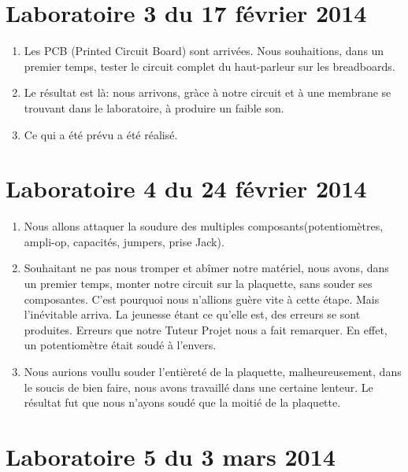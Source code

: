 \documentclass{report}
\begin{document}
\section{Laboratoire 3 du 17 février 2014}

\begin{enumerate}

\item  Les PCB (Printed Circuit Board) sont arrivées. Nous souhaitions, dans un premier temps, tester le circuit complet du haut-parleur sur les breadboards.

\item Le résultat est là: nous arrivons, gràce à notre circuit et à une membrane se trouvant dans le
laboratoire, à produire un faible son.

\item Ce qui a été prévu a été réalisé.

\end{enumerate}

\section{Laboratoire 4 du 24 février 2014}
\begin{enumerate}
\item
 Nous allons attaquer la soudure des multiples composants(potentiomètres, ampli-op, capacités, jumpers, prise Jack). 

\item
Souhaitant ne pas nous tromper et abîmer notre matériel, nous avons, dans un premier temps, monter notre circuit sur la plaquette, sans souder ses composantes. C'est pourquoi nous n'allions guère vite à cette étape. Mais l'inévitable arriva. La jeunesse étant ce qu'elle est, des erreurs se sont produites. Erreurs 
que notre Tuteur Projet nous a fait remarquer. En effet, un potentiomètre était soudé à l'envers.    

\item Nous aurions voullu souder l'entièreté de la plaquette, malheureusement, dans le soucis de bien faire, nous avons travaillé dans une certaine lenteur. Le résultat fut que nous n'ayons soudé que la moitié de la plaquette.

\end{enumerate}

\section{Laboratoire 5 du 3 mars 2014}
\end{document}
